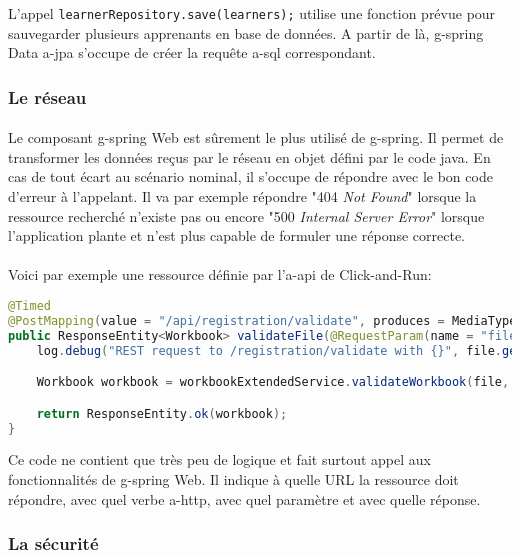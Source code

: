 L'appel \lstinline{learnerRepository.save(learners);} utilise une fonction prévue pour sauvegarder plusieurs apprenants en base de données.
A partir de là, \gls{g-spring} Data \acrshort{a-jpa} s'occupe de créer la requête \gls{a-sql} correspondant.

\subsubsection{Le réseau}
\label{subsubsec:spring-web}

\paragraph{}
Le composant \Gls{g-spring} Web est sûrement le plus utilisé de \gls{g-spring}.
Il permet de transformer les données reçus par le réseau en objet défini par le code java.
En cas de tout écart au scénario nominal, il s'occupe de répondre avec le bon code d'erreur à l'appelant.
Il va par exemple répondre "404 \textit{Not Found}" lorsque la ressource recherché n'existe pas ou encore "500 \textit{Internal Server Error}" lorsque l'application plante et n'est plus capable de formuler une réponse correcte.

\paragraph{}
Voici par exemple une ressource définie par l'\gls{a-api} de Click-and-Run\fnmark{}:
\begin{lstlisting}[language=Java]
@Timed
@PostMapping(value = "/api/registration/validate", produces = MediaType.APPLICATION_JSON_UTF8_VALUE)
public ResponseEntity<Workbook> validateFile(@RequestParam(name = "file") MultipartFile file) {
    log.debug("REST request to /registration/validate with {}", file.getOriginalFilename());

    Workbook workbook = workbookExtendedService.validateWorkbook(file, new RegistrationWorkbook());

    return ResponseEntity.ok(workbook);
}
\end{lstlisting}
Ce code ne contient que très peu de logique et fait surtout appel aux fonctionnalités de \Gls{g-spring} Web. Il indique à quelle URL la ressource doit répondre, avec quel verbe \gls{a-http}, avec quel paramètre et avec quelle réponse.

\subsubsection{La sécurité}
\label{spring-boot-starter-security}

